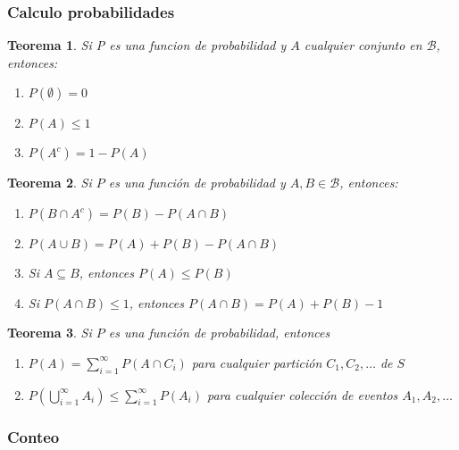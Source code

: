 \documentclass[14pt]{extarticle}
\newtheorem{theorem}{Teorema}[section]
\begin{document}
\subsubsection{Calculo probabilidades}
\begin{theorem}
    Si P es una funcion de probabilidad y $A$ cualquier conjunto en $\mathcal{B}$, entonces:
    \begin{enumerate}
        \item $P(\emptyset) = 0$
        \item $P(A) \leq 1$
        \item $P(A^c) = 1 - P(A)$
    \end{enumerate}
\end{theorem}

\begin{theorem}
    Si $P$ es una función de probabilidad y $A, B \in \mathcal{B}$, entonces:
    \begin{enumerate}
        \item $P(B \cap A^c) = P(B) - P(A \cap B)$
        \item $P(A \cup B) = P(A) + P(B) - P(A \cap B)$
        \item Si $A \subseteq B$, entonces $P(A) \leq P(B)$
        \item Si $P(A \cap B) \leq 1$, entonces $P(A \cap B) = P(A) + P(B) - 1$
    \end{enumerate}
\end{theorem}

\begin{theorem}
    Si $P$ es una función de probabilidad, entonces
    \begin{enumerate}
        \item $P(A) = \sum_{i=1}^\infty P(A \cap C_i)$ para cualquier partición $C_1, C_2, \ldots$ de $S$
        \item $P(\bigcup_{i=1}^\infty A_i) \leq \sum_{i=1}^\infty P(A_i)$ para cualquier colección de eventos $A_1, A_2, \ldots$
    \end{enumerate}
\end{theorem}


\subsubsection{Conteo}
\end{document}
